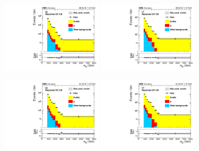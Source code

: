 \begin{figure}[htbp]
  \centering

  \includegraphics[width=0.45\textwidth]{figures/2016/AfterZPtReweight_AfterDYNorm_AfterDYReshape_WRCand_Mass_HNWR_SingleElectron_Resolved_DYCR.pdf}
  \hspace{0.01\textwidth}
  \includegraphics[width=0.45\textwidth]{figures/2016/AfterZPtReweight_AfterDYNorm_AfterDYReshape_WRCand_Mass_HNWR_SingleMuon_Resolved_DYCR.pdf}
  \vspace{0.01\textwidth}

  \includegraphics[width=0.45\textwidth]{figures/2017/AfterZPtReweight_AfterDYNorm_AfterDYReshape_WRCand_Mass_HNWR_SingleElectron_Resolved_DYCR.pdf}
  \hspace{0.01\textwidth}
  \includegraphics[width=0.45\textwidth]{figures/2017/AfterZPtReweight_AfterDYNorm_AfterDYReshape_WRCand_Mass_HNWR_SingleMuon_Resolved_DYCR.pdf}
  \vspace{0.01\textwidth}


\end{figure}
